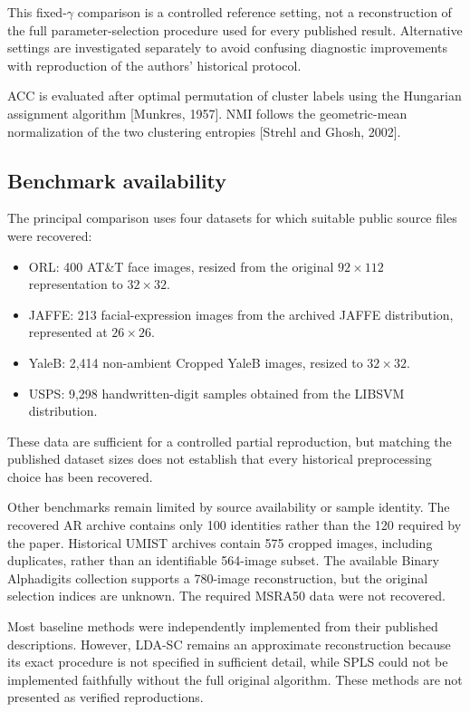 \documentclass{article}
\begin{document}
This fixed-\(\gamma\) comparison is a controlled reference setting, not a reconstruction of the full parameter-selection procedure used for every published result. Alternative settings are investigated separately to avoid confusing diagnostic improvements with reproduction of the authors' historical protocol.

ACC is evaluated after optimal permutation of cluster labels using the Hungarian assignment algorithm [Munkres, 1957]. NMI follows the geometric-mean normalization of the two clustering entropies [Strehl and Ghosh, 2002].

\subsection{Benchmark availability}

The principal comparison uses four datasets for which suitable public source files were recovered:
\begin{itemize}
\item ORL: 400 AT\&T face images, resized from the original \(92\times112\) representation to \(32\times32\).
\item JAFFE: 213 facial-expression images from the archived JAFFE distribution, represented at \(26\times26\).
\item YaleB: 2,414 non-ambient Cropped YaleB images, resized to \(32\times32\).
\item USPS: 9,298 handwritten-digit samples obtained from the LIBSVM distribution.
\end{itemize}

These data are sufficient for a controlled partial reproduction, but matching the published dataset sizes does not establish that every historical preprocessing choice has been recovered.

Other benchmarks remain limited by source availability or sample identity. The recovered AR archive contains only 100 identities rather than the 120 required by the paper. Historical UMIST archives contain 575 cropped images, including duplicates, rather than an identifiable 564-image subset. The available Binary Alphadigits collection supports a 780-image reconstruction, but the original selection indices are unknown. The required MSRA50 data were not recovered.

Most baseline methods were independently implemented from their published descriptions. However, LDA-SC remains an approximate reconstruction because its exact procedure is not specified in sufficient detail, while SPLS could not be implemented faithfully without the full original algorithm. These methods are not presented as verified reproductions.
\end{document}
